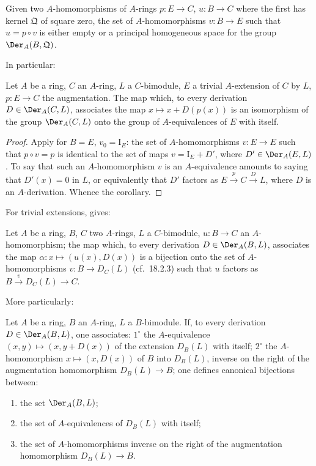 \begin{corollary}[20.1.3]
\label{0.20.1.3}
Given two $A$-homomorphisms of $A$-rings $p:E\to C$, $u:B\to C$ where the first has kernel $\mathfrak{Q}$ of square zero, the set of $A$-homomorphisms $v:B\to E$ such that $u=p\circ v$ is either empty or a principal homogeneous space for the group $\Der_A(B,\mathfrak{Q})$.
\end{corollary}

In particular:

\begin{corollary}[20.1.4]
\label{0.20.1.4}
Let $A$ be a ring, $C$ an $A$-ring, $L$ a $C$-bimodule, $E$ a trivial $A$-extension of $C$ by $L$, $p:E\to C$ the augmentation.
The map which, to every derivation $D\in\Der_A(C,L)$, associates the map $x\mapsto x+D(p(x))$ is an isomorphism of the group $\Der_A(C,L)$ onto the group of $A$-equivalences of $E$ with itself.
\end{corollary}

\begin{proof}
Apply  for $B=E$, $v_0=\mathrm{I}_E$: the set of $A$-homomorphisms $v:E\to E$ such that $p\circ v=p$ is identical to the set of maps $v=\mathrm{I}_E+D'$, where $D'\in\Der_A(E,L)$.
To say that such an $A$-homomorphism $v$ is an $A$-equivalence amounts to saying that $D'(x)=0$ in $L$, or equivalently that $D'$ factors as $E\xrightarrow{p}C\xrightarrow{D}L$, where $D$ is an $A$-derivation.
Whence the corollary.
\end{proof}

For trivial extensions,  gives:

\begin{corollary}[20.1.5]
\label{0.20.1.5}
Let $A$ be a ring, $B$, $C$ two $A$-rings, $L$ a $C$-bimodule, $u:B\to C$ an $A$-homomorphism; the map which, to every derivation $D\in\Der_A(B,L)$, associates the map $\alpha:x\mapsto(u(x),D(x))$ is a bijection onto the set of $A$-homomorphisms $v:B\to D_C(L)$ \textup{(}cf.\ 18.2.3\textup{)} such that $u$ factors as $B\xrightarrow{v}D_C(L)\to C$.
\end{corollary}

More particularly:

\begin{corollary}[20.1.6]
\label{0.20.1.6}
Let $A$ be a ring, $B$ an $A$-ring, $L$ a $B$-bimodule.
If, to every derivation $D\in\Der_A(B,L)$, one associates: $1^\circ$ the $A$-equivalence $(x,y)\mapsto(x,y+D(x))$ of the extension $D_B(L)$ with itself; $2^\circ$ the $A$-homomorphism $x\mapsto(x,D(x))$ of $B$ into $D_B(L)$, inverse on the right of the augmentation homomorphism $D_B(L)\to B$; one defines canonical bijections between:
\begin{enumerate}
  \item[\rm(i)] the set $\Der_A(B,L)$;
  \item[\rm(ii)] the set of $A$-equivalences of $D_B(L)$ with itself;
  \item[\rm(iii)] the set of $A$-homomorphisms inverse on the right of the augmentation homomorphism $D_B(L)\to B$.
\end{enumerate}
\end{corollary}

